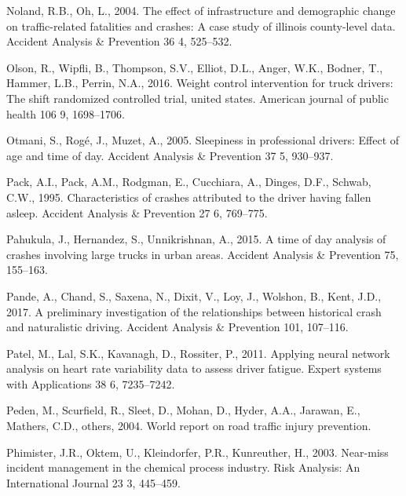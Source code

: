 \documentclass[12pt]{book}
\numberwithin{equation}{chapter}
\begin{document}
\leavevmode\hypertarget{ref-noland2004effect}{}%
Noland, R.B., Oh, L., 2004. The effect of infrastructure and demographic change on traffic-related fatalities and crashes: A case study of illinois county-level data. Accident Analysis \& Prevention 36 4, 525--532.

\leavevmode\hypertarget{ref-olson2016weight}{}%
Olson, R., Wipfli, B., Thompson, S.V., Elliot, D.L., Anger, W.K., Bodner, T., Hammer, L.B., Perrin, N.A., 2016. Weight control intervention for truck drivers: The shift randomized controlled trial, united states. American journal of public health 106 9, 1698--1706.

\leavevmode\hypertarget{ref-otmani2005sleepiness}{}%
Otmani, S., Rogé, J., Muzet, A., 2005. Sleepiness in professional drivers: Effect of age and time of day. Accident Analysis \& Prevention 37 5, 930--937.

\leavevmode\hypertarget{ref-pack1995characteristics}{}%
Pack, A.I., Pack, A.M., Rodgman, E., Cucchiara, A., Dinges, D.F., Schwab, C.W., 1995. Characteristics of crashes attributed to the driver having fallen asleep. Accident Analysis \& Prevention 27 6, 769--775.

\leavevmode\hypertarget{ref-pahukula2015time}{}%
Pahukula, J., Hernandez, S., Unnikrishnan, A., 2015. A time of day analysis of crashes involving large trucks in urban areas. Accident Analysis \& Prevention 75, 155--163.

\leavevmode\hypertarget{ref-pande2017preliminary}{}%
Pande, A., Chand, S., Saxena, N., Dixit, V., Loy, J., Wolshon, B., Kent, J.D., 2017. A preliminary investigation of the relationships between historical crash and naturalistic driving. Accident Analysis \& Prevention 101, 107--116.

\leavevmode\hypertarget{ref-patel2011applying}{}%
Patel, M., Lal, S.K., Kavanagh, D., Rossiter, P., 2011. Applying neural network analysis on heart rate variability data to assess driver fatigue. Expert systems with Applications 38 6, 7235--7242.

\leavevmode\hypertarget{ref-peden2004world}{}%
Peden, M., Scurfield, R., Sleet, D., Mohan, D., Hyder, A.A., Jarawan, E., Mathers, C.D., others, 2004. World report on road traffic injury prevention.

\leavevmode\hypertarget{ref-phimister2003near}{}%
Phimister, J.R., Oktem, U., Kleindorfer, P.R., Kunreuther, H., 2003. Near-miss incident management in the chemical process industry. Risk Analysis: An International Journal 23 3, 445--459.
\end{document}
